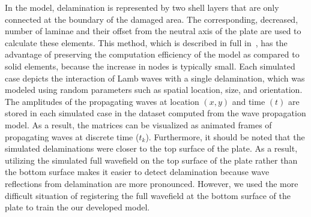 \documentclass[runningheads]{llncs}
\begin{document}
In the model, delamination is represented by two shell layers that are only connected at the boundary of the damaged area.
The corresponding, decreased, number of laminae and their offset from the neutral axis of the plate are used to calculate these elements.
This method, which is described in full in~\cite{Kudela2009}, has the advantage of preserving the computation efficiency of the model as compared to solid elements, because the increase in nodes is typically small.
Each simulated case depicts the interaction of Lamb waves with a single delamination, which was modeled using random parameters such as spatial location, size, and orientation.
The amplitudes of the propagating waves at location \((x,y)\) and time \((t)\) are stored in each simulated case in the dataset computed from the wave propagation model.
As a result, the matrices can be visualized as animated frames of propagating waves at discrete time (\(t_k\)).
Furthermore, it should be noted that the simulated delaminations were closer to the top surface of the plate.
As a result, utilizing the simulated full wavefield on the top surface of the plate rather than the bottom surface makes it easier to detect delamination because wave reflections from delamination are more pronounced.
However, we used the more difficult situation of registering the full wavefield at the bottom surface of the plate to train the our developed model.
\end{document}
